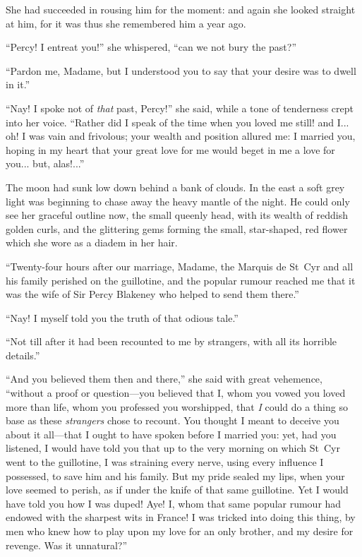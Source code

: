 She had succeeded in rousing him for the moment: and again she looked straight at him, for it was thus she remembered him a year ago.

\enquote{Percy! I entreat you!} she whispered, \enquote{can we not bury the past?}

\enquote{Pardon me, Madame, but I understood you to say that your desire was to dwell in it.}

\enquote{Nay! I spoke not of \textit{that} past, Percy!} she said, while a tone of tenderness crept into her voice. \enquote{Rather did I speak of the time when you loved me still! and I... oh! I was vain and frivolous; your wealth and position allured me: I married you, hoping in my heart that your great love for me would beget in me a love for you... but, alas!...}

The moon had sunk low down behind a bank of clouds. In the east a soft grey light was beginning to chase away the heavy mantle of the night. He could only see her graceful outline now, the small queenly head, with its wealth of reddish golden curls, and the glittering gems forming the small, star-shaped, red flower which she wore as a diadem in her hair.

\enquote{Twenty-four hours after our marriage, Madame, the Marquis de St~Cyr and all his family perished on the guillotine, and the popular rumour reached me that it was the wife of Sir Percy Blakeney who helped to send them there.}

\enquote{Nay! I myself told you the truth of that odious tale.}

\enquote{Not till after it had been recounted to me by strangers, with all its horrible details.}

\enquote{And you believed them then and there,} she said with great vehemence, \enquote{without a proof or question---you believed that I, whom you vowed you loved more than life, whom you professed you worshipped, that \textit{I} could do a thing so base as these \textit{strangers} chose to recount. You thought I meant to deceive you about it all---that I ought to have spoken before I married you: yet, had you listened, I would have told you that up to the very morning on which St~Cyr went to the guillotine, I was straining every nerve, using every influence I possessed, to save him and his family. But my pride sealed my lips, when your love seemed to perish, as if under the knife of that same guillotine. Yet I would have told you how I was duped! Aye! I, whom that same popular rumour had endowed with the sharpest wits in France! I was tricked into doing this thing, by men who knew how to play upon my love for an only brother, and my desire for revenge. Was it unnatural?}

